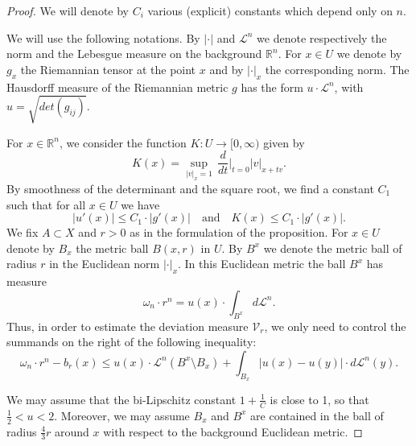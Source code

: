 \documentclass[12pt,leqno,intlimits]{amsart}
\numberwithin{equation}{section}
\theoremstyle{definition}
\theoremstyle{remark}
\newcommand{\R}{\mathbb{R}}
\def\:{\colon}
\begin{document}
\begin{proof}
We will denote by $C_i$ various (explicit) constants which depend only on $n$.

We will use the following notations. By $|\cdot|$ and $\mathcal L^n$ we denote respectively the norm and the Lebesgue measure on the background $\R^n$.
For $x\in U$ we denote by $g_x$ the Riemannian tensor at the point $x$ and
by $|\cdot |_x$ the corresponding norm. %
The Hausdorff measure of the Riemannian metric
$g$ has the form $u\cdot \mathcal L^n$, with $u=\sqrt {det (g_{ij})}$.

For $x\in \R^n$, we consider the function $K \:U\to [0,\infty)$ given by
$$K (x)=\sup _{|v|_x =1}\, \frac d {dt}\Big |_{t=0} |v| _{x+tv}.$$
By smoothness of the determinant and the square root,
we find a constant $C_1$ such that for all $x\in U$ we have
\begin{equation} \label{eq:Kg}
|u' (x)| \leq C_1\cdot |g' (x)|
\quad\text{and}\quad
K (x) \leq C_1 \cdot |g' (x)|.
\end{equation}
We fix $A\subset X$ and $r>0$ as in the formulation of the proposition.
For $x\in U$ denote by $B_x$
the metric ball $B(x,r)$ in $U$.
By $B^x$ we denote the metric ball of radius $r$ in the Euclidean norm $|\cdot |_x$. In this Euclidean metric the ball $B^x$ has measure
$$\omega _n\cdot r^n =u(x)\cdot \int _{B^x} d\mathcal L^n.$$
Thus, in order to estimate the deviation measure $\mathcal{V}_r$, we only need to control the summands on the right of the following inequality:
\begin{equation} \label{eq:summand}
\omega_n \cdot r^n - b_r (x) \leq u(x) \cdot \mathcal L^n( B^x\setminus B_x) + \int _{B_x} |u(x)- u(y)| \cdot
d\mathcal L^n (y).
\end{equation}

We may assume that the bi-Lipschitz constant $1+\frac 1 C$ is close to 1, so that $\frac 1 2 < u <2$. Moreover, we may assume $B_x$ and $B^x$ are contained in the ball of radius $\frac 4 3 r$ around $x$ with respect to the background Euclidean metric.


\end{proof}
\end{document}

